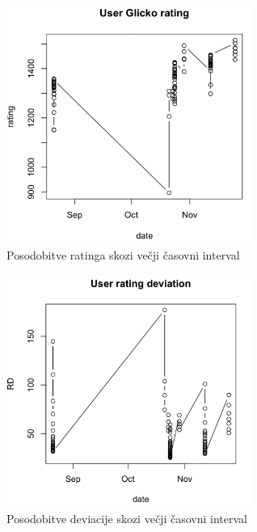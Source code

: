 \documentclass{IEEEtran}
\begin{document}

\begin{figure}[h!]
    \includegraphics[width=8cm]{GlickoUserExampleBig}
    \caption{Posodobitve ratinga skozi večji časovni interval}%
    \label{fig:example}%
\end{figure}
\begin{figure}[h!]
    \includegraphics[width=8cm]{RDUserExampleBig}
    \caption{Posodobitve deviacije skozi večji časovni interval}%
    \label{fig:example}%
\end{figure}
\end{document}
